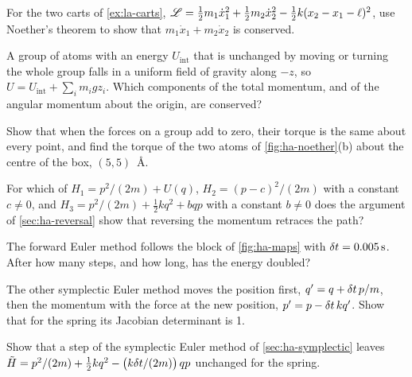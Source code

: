 \begin{exercise}
\label{ex:ha-carts}
For the two carts of \cref{ex:la-carts}, $\mathscr{L} = \frac12 m_1\dot{x}_1^2 +
\frac12 m_2\dot{x}_2^2 - \frac12 k(x_2 - x_1 - \ell)^2$, use Noether's
theorem to show that $m_1\dot{x}_1 + m_2\dot{x}_2$ is conserved.
\end{exercise}

\begin{exercise}
\label{ex:ha-gravity}
A group of atoms with an energy $U_{\mathrm{int}}$ that is unchanged by
moving or turning the whole group falls in a uniform field of gravity
along $-z$, so $U = U_{\mathrm{int}} + \sum_im_igz_i$. Which components
of the total momentum, and of the angular momentum about the origin, are
conserved?
\end{exercise}

\begin{exercise}
\label{ex:ha-torque-point}
Show that when the forces on a group add to zero, their torque is the
same about every point, and find the torque of the two atoms of
\cref{fig:ha-noether}(b) about the centre of the box, $(5,
5)$~\si{\angstrom}.
\end{exercise}

\begin{exercise}
\label{ex:ha-even}
For which of $H_1 = p^2/(2m) + U(q)$, $H_2 = (p - c)^2/(2m)$ with a
constant $c \ne 0$, and $H_3 = p^2/(2m) + \frac12 kq^2 + bqp$ with a
constant $b \ne 0$ does the argument of \cref{sec:ha-reversal} show that
reversing the momentum retraces the path?
\end{exercise}

\begin{exercise}
\label{ex:ha-doubling}
The forward Euler method follows the block of \cref{fig:ha-maps} with
$\delta t = \SI{0.005}{\second}$. After how many steps, and how long, has the
energy doubled?
\end{exercise}

\begin{exercise}
\label{ex:ha-other}
The other symplectic Euler method moves the position first, $q' = q +
\delta t\,p/m$, then the momentum with the force at the new position, $p' =
p - \delta t\,kq'$. Show that for the spring its Jacobian determinant is 1.
\end{exercise}

\begin{exercise}
\label{ex:ha-shadow}
Show that a step of the symplectic Euler method of
\cref{sec:ha-symplectic} leaves $\tilde{H} = p^2/(2m) + \frac12 kq^2 -
\bigl(k\delta t/(2m)\bigr)\,qp$ unchanged for the spring.
\end{exercise}
